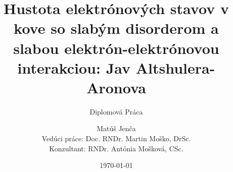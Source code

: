 \documentclass[
	11pt, %
]{beamer}
\title[Diplomová práca]{ Hustota elektrónových stavov v kove so slabým disorderom a slabou elektrón-elektrónovou interakciou: Jav Altshulera-Aronova} %
\subtitle{Diplomová Práca} %
\author[Matúš Jenča]{Matúš Jenča \\
Vedúci práce:  Doc. RNDr. Martin Moško, DrSc. \\
Konzultant: RNDr. Antónia Mošková, CSc. \\
} %
\institute[FMFI UK]{Fakulta matematiky, Fyziky a Informatiky} %
\date[\today]{\today} %
\begin{document}

\begin{frame}
	\titlepage %
\end{frame}


\end{document}
